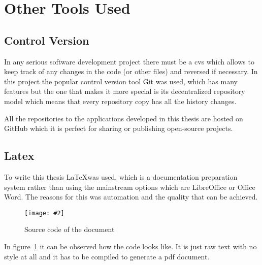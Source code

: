 \documentclass[hidelinks,11pt,a4paper,oneside,article]{memoir}
\newcommand{\putimage}[3][10] %
{
\begin{figure}[h]
	\centering
	\captionsetup{justification=centering}
	\texttt{[image: \#2]}
	\caption{#3}
	\label{fig:#2}
\end{figure}
}
\begin{document}

\section{Other Tools Used}

\subsection*{Control Version}
In any serious software development project there must be a \gls{cvs} which allows to keep track of any changes in the code (or other files) and reversed if necessary. In this project the popular control version tool Git was used, which has many features but the one that makes it more special is its decentralized repository model which means that every repository copy has all the history changes.

All the repositories to the applications developed in this thesis are hosted on GitHub which it is perfect for sharing or publishing open-source projects.

\subsection*{Latex}
To write this thesis \LaTeX was used, which is a documentation preparation system rather than using the mainstream options which are LibreOffice or Office Word. The reasons for this was automation and the quality that can be achieved.

    \putimage{latex-look}{Source code of the document}
    
In figure~\ref{fig:latex-look} it can be observed how the code looks like. It is just raw text with no style at all and it has to be compiled to generate a \gls{pdf} document.
\end{document}
